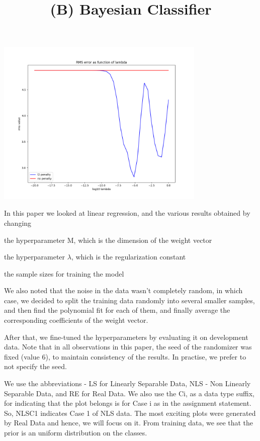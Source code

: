 \documentclass[11pt]{article}
\newenvironment{packed_enum}{
\begin{enumerate}
  \setlength{\itemsep}{1pt}
  \setlength{\parskip}{0pt}
  \setlength{\parsep}{0pt}
}{\end{enumerate}}
\begin{document}
\begin{center}
  \includegraphics[width=10cm]
  {regression/2d-rms-vs-lam-fig.png}
\end{center}

In this paper we looked at linear regression, and the various results obtained by changing
\begin{packed_enum}
  \item the hyperparameter M, which is the dimension of the weight vector
  \item the hyperparameter \(\lambda\), which is the regularization constant
  \item the sample sizes for training the model
\end{packed_enum}

We also noted that the noise in the data wasn't completely random, in which case, we decided to split the training data randomly into several smaller samples, and then find the polynomial fit for each of them, and finally average the corresponding coefficients of the weight vector.

After that, we fine-tuned the hyperparameters by evaluating it on development data. Note that in all observations in this paper, the seed of the randomizer was fixed (value 6), to maintain consistency of the results. In practise, we prefer to not specify the seed.

\newpage
\begin{center}
\title*{\LARGE \textbf{(B) Bayesian Classifier}}
\end{center}
We use the abbreviations - LS for Linearly Separable Data, NLS - Non Linearly Separable Data, and RE for Real Data. We also use the Ci, as a data type suffix, for indicating that the plot belongs is for Case i as in the assignment statement. So, NLSC1 indicates Case 1 of NLS data. The most exciting plots were generated by Real Data and hence, we will focus on it. From training data, we see that the prior is an uniform distribution on the classes.
\end{document}
